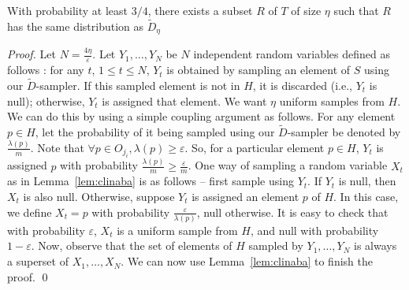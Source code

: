 \documentclass[11pt]{llncs}
\newcommand{\veps}{\varepsilon}
\newcommand{\D}{\tilde{D}}
\begin{document}
\begin{lemma}
\label{lem:final}
With probability at least $3/4$, there exists a subset $R$ of $T$ of size $\eta$ such that $R$ has the same distribution as $\D_{\eta}$
\end{lemma}
\begin{proof}
Let $N = \frac{4\eta}{\veps}$.
Let $Y_1, \ldots, Y_N$ be  $N$ independent random variables defined as follows : 
for any $t$, $1 \leq t \leq N$, $Y_t$ is obtained by sampling an element of $S$ using our $\D$-sampler.
If this sampled element is not in $H$, it is discarded (i.e., $Y_t$ is null); otherwise, $Y_t$ is assigned that element.
We want $\eta$ uniform samples from $H$. 
We can do this by using a simple coupling argument as follows.
For any element $p \in H$, let the probability of it being sampled using our $\D$-sampler be denoted by $\frac{\lambda(p)}{m}$.
Note that $\forall p \in O_{j_i}, \lambda(p) \geq \veps$.
So, for a particular element $p \in H$, $Y_t$ is assigned $p$ with probability $\frac{\lambda(p)}{m} \geq \frac{\veps}{m}$.
One way of sampling a random variable $X_t$ as in Lemma~\ref{lem:clinaba} is as follows --  first sample using $Y_t$. If $Y_t$ is null, then $X_t$ is also null. 
Otherwise, suppose $Y_t$ is assigned an element $p$ of $H$. 
In this case, we define $X_t = p$ with probability $\frac{\veps}{\lambda(p)}$, null otherwise. 
It is easy to check that with probability $\veps$, $X_t$ is a uniform sample from $H$, and null with probability $1-\veps$. 
Now, observe that the set of elements of $H$ sampled by $Y_1, \ldots, Y_N$ is always a superset of $X_1, \ldots, X_N$. 
We can now use Lemma~\ref{lem:clinaba} to finish the proof. \qed
\end{proof}
\end{document}
